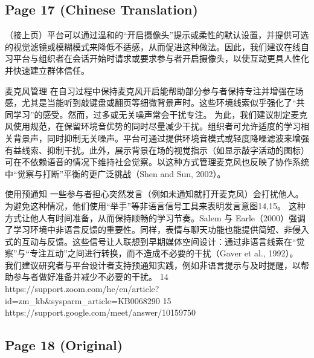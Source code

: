 \documentclass[12pt]{ctexart}
\begin{document}
\subsection*{Page 17 (Chinese Translation)}

（接上页）平台可以通过温和的“开启摄像头”提示或柔性的默认设置，并提供可选的视觉滤镜或模糊模式来降低不适感，从而促进这种做法。因此，我们建议在线自习平台与组织者在会话开始时请求或要求参与者开启摄像头，以使互动更具人性化并快速建立群体信任。

麦克风管理
在自习过程中保持麦克风开启能帮助部分参与者保持专注并增强在场感，尤其是当能听到敲键盘或翻页等细微背景声时。这些环境线索似乎强化了“共同学习”的感受。然而，过多或无关噪声常会干扰专注。
为此，我们建议制定麦克风使用规范，在保留环境音优势的同时尽量减少干扰。组织者可允许适度的学习相关背景声，同时抑制无关噪声。平台可通过提供环境音模式或轻度降噪滤波来增强有益线索、抑制干扰。此外，展示背景在场的视觉指示（如显示敲字活动的图标）可在不依赖语音的情况下维持社会觉察。以这种方式管理麦克风也反映了协作系统中“觉察与打断”平衡的更广泛挑战（Shen and Sun, 2002）。

使用预通知
一些参与者担心突然发言（例如未通知就打开麦克风）会打扰他人。为避免这种情况，他们使用“举手”等非语言信号工具来表明发言意图14,15。
这种方式让他人有时间准备，从而保持顺畅的学习节奏。Salem 与 Earle（2000）强调了学习环境中非语言反馈的重要性。同样，表情与聊天功能也能提供简短、非侵入式的互动与反馈。这些信号让人联想到早期媒体空间设计：通过非语言线索在“觉察”与“专注互动”之间进行转换，而不造成不必要的干扰（Gaver et al., 1992）。
我们建议研究者与平台设计者支持预通知实践，例如非语言提示与及时提醒，以帮助参与者做好准备并减少不必要的干扰。
14 https://support.zoom.com/hc/en/article?id=zm\_kb\&sysparm\_article=KB0068290
15 https://support.google.com/meet/answer/10159750

\subsection*{Page 18 (Original)}
\end{document}
